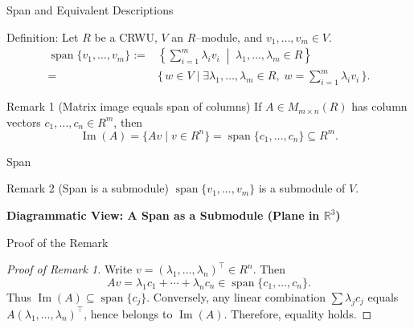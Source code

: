 \documentclass[11pt,aspectratio=43,ignorenonframetext,t]{beamer}
\begin{document}
\begin{frame}{Span and Equivalent Descriptions}

\begin{block}{Definition:}
Let $R$ be a CRWU, $V$ an $R$–module, and $v_1,\dots,v_m\in V$.
\begin{align*}
\operatorname{span}\{v_1,\dots,v_m\}
:= &\left\{\sum_{i=1}^m \lambda_i v_i \;\middle|\; \lambda_1,\dots,\lambda_m\in R\right\}\\
=& \{\, w\in V \mid \exists\lambda_1,\dots,\lambda_m\in R,\; w=\sum_{i=1}^m \lambda_i v_i \,\}.    
\end{align*}

\end{block}

\begin{block}{Remark 1 (Matrix image equals span of columns)}
If $A\in M_{m\times n}(R)$ has column vectors $c_1,\dots,c_n\in R^m$, then
\[
\operatorname{Im}(A)=\{Av\mid v\in R^n\}=\operatorname{span}\{c_1,\dots,c_n\}\subseteq R^m.
\]
\end{block}

\end{frame}


\begin{frame}{Span}

\begin{block}{Remark 2 (Span is a submodule)}
$\operatorname{span}\{v_1,\dots,v_m\}$ is a submodule of $V$.
\end{block}

\textbf{Diagrammatic View: A Span as a Submodule (Plane in $\mathbb{R}^3$)}
\begin{center}
\end{center}
\end{frame}


\begin{frame}{Proof of the Remark}
\begin{proof}[Proof of Remark 1]
Write $v=(\lambda_1,\dots,\lambda_n)^{\!\top}\in R^n$. Then
\[
Av=\lambda_1 c_1+\cdots+\lambda_n c_n\in \operatorname{span}\{c_1,\dots,c_n\}.
\]
Thus $\operatorname{Im}(A)\subseteq \operatorname{span}\{c_j\}$. Conversely, any linear combination $\sum \lambda_j c_j$ equals $A(\lambda_1,\dots,\lambda_n)^{\!\top}$, hence belongs to $\operatorname{Im}(A)$. Therefore, equality holds.
\end{proof}

\end{frame}
\end{document}
